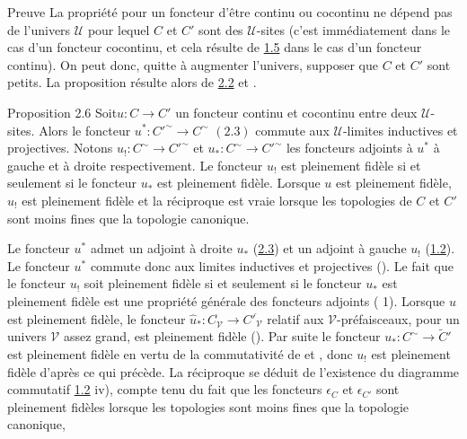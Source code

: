 \begin{enonce*}[remark]{Preuve}
La propriété pour un foncteur d'être continu ou cocontinu ne
dépend pas de l'univers $𝒰$ pour lequel $C$ et $C'$ sont des
$𝒰$-sites (c'est immédiatement dans le cas d'un foncteur
cocontinu, et cela résulte de \hyperref[III.prop1.5]{1.5} dans le cas d'un
foncteur continu). On peut donc, quitte à augmenter l'univers,
supposer que $C$ et $C'$ sont petits. La proposition résulte alors
de \hyperref[III.prop2.2]{2.2} et .
\end{enonce*}

\begin{enonce*}{Proposition 2.6}
Soit\pageoriginale $u:C\rightarrow C'$ un foncteur continu et
cocontinu entre deux $𝒰$-sites. Alors le foncteur
$u^{\ast}:{C'}^{\sim}\rightarrow C^{\sim}$ $(\hyperref[III.prop2.3]{2.3})$
commute aux $𝒰$-limites inductives et projectives. Notons
$u_{!}:C^{\sim}\rightarrow {C'}^{\sim}$ et
$u_{\ast}:C^{\sim}\rightarrow {C'}^{\sim}$ les foncteurs adjoints à
$u^{\ast}$ à gauche et à droite respectivement. Le foncteur $u_{!}$
est pleinement fidèle si et seulement si le foncteur $u_{\ast}$ est
pleinement fidèle. Lorsque $u$ est pleinement fidèle, $u_{!}$ est
pleinement fidèle et la réciproque est vraie lorsque les topologies
de $C$ et $C'$ sont moins fines que la topologie canonique.
\end{enonce*}

Le foncteur $u^{\ast}$ admet un adjoint à droite $u_{\ast}$
(\hyperref[III.prop2.3]{2.3}) et un adjoint à gauche $u_{!}$
(\hyperref[III.prop1.2]{1.2}). Le foncteur $u^{\ast}$ commute donc aux limites
inductives et projectives (). Le fait que le
foncteur $u_{!}$ soit pleinement fidèle si et seulement si le
foncteur $u_{\ast}$ est pleinement fidèle est une
propriété générale des foncteurs adjoints
( 1). Lorsque $u$ est pleinement fidèle, le foncteur
$\widehat{u}_{\ast}:C^{\widehat{\phantom{,}}}_{𝒱}\rightarrow
{C'}^{\widehat{\phantom{,}}}_{𝒱}$ relatif aux
$𝒱$-préfaisceaux, pour un univers $𝒱$ assez
grand, est pleinement fidèle (). Par suite le
foncteur $u_{\ast}:C^{\sim}\rightarrow \widetilde{C}'$ est
pleinement fidèle en vertu de la commutativité de
 et , donc $u_{!}$ est pleinement
fidèle d'après ce qui précède. La réciproque se
déduit de l'existence du diagramme commutatif \hyperref[III.prop1.2]{1.2}
iv), compte tenu du fait que les foncteurs $\epsilon_C$ et
$\epsilon_{C'}$ sont pleinement fidèles lorsque les topologies
sont moins fines que la topologie canonique, \cqfd

